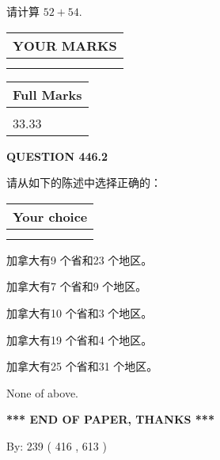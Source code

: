 \documentclass{ctexart}
\begin{document}
  
 
请计算 $ %
52 +  %
54 $.
 

 

 
  
\vspace{0.2in}
  
\noindent\begin{tabular}{|l|}
\hline
 YOUR MARKS  \\
\hline
 \\ 
 \\ 
\hline
\end{tabular}
\hspace{0.05in} \begin{tabular}{|l|}
\hline
 Full Marks  \\
\hline
 \\ 
33.33 \\
\hline
\end{tabular}
{\textbf{\Large{QUESTION
446.2 
}}}
  
  
请从如下的陈述中选择正确的：
  
  
\noindent\hspace{3.0in} \begin{tabular}{|l|}
\hline
Your choice \\
\hline
 \\ 
 \\ 
\hline
\end{tabular}
  
  
 
 
加拿大有9 个省和23 个地区。
 
 
加拿大有7 个省和9 个地区。
 
 
加拿大有10 个省和3 个地区。
 
 
加拿大有19 个省和4 个地区。
 
 
加拿大有25 个省和31 个地区。
 
 
 None of above.
 
 
   
   
 \vspace{0.2in}
 
   
   
   
   
\vspace{1.0in} 
{\textbf{\large{ *** END OF PAPER, THANKS *** }}} 
   
   
\hspace{1.0in} By: 
 239 ( 416 ,  613 )
   
\end{document}

